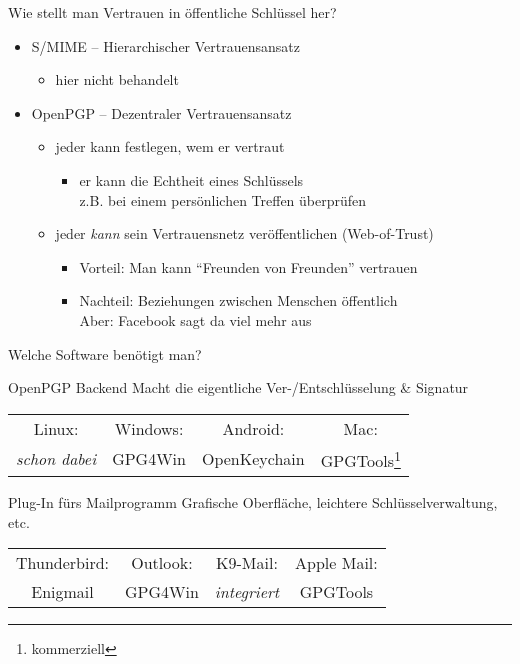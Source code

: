 \begin{frame}{Wie stellt man Vertrauen in öffentliche Schlüssel her?}
  \begin{itemize}
    \item S/MIME -- Hierarchischer Vertrauensansatz
    \begin{itemize}
      \item hier nicht behandelt
    \end{itemize}
    \item OpenPGP -- Dezentraler Vertrauensansatz
    \begin{itemize}
      \item jeder kann festlegen, wem er vertraut
      \begin{itemize}
        \item er kann die Echtheit eines Schlüssels\\ z.B. bei einem persönlichen Treffen überprüfen
      \end{itemize}
      \item jeder \emph{kann} sein Vertrauensnetz veröffentlichen (Web-of-Trust)
      \begin{itemize}
        \item Vorteil: Man kann ``Freunden von Freunden'' vertrauen
        \item Nachteil: Beziehungen zwischen Menschen öffentlich\\ Aber: Facebook sagt da viel mehr aus
      \end{itemize}
    \end{itemize}
  \end{itemize}
\end{frame}

\begin{frame}{Welche Software benötigt man?}
  \begin{block}{OpenPGP Backend}
    Macht die eigentliche Ver-/Entschlüsselung \& Signatur

    \vspace{1ex}
    \begin{tabular}{cccc}
      Linux:            & Windows: & Android:     & Mac:\\
      \emph{schon dabei} & GPG4Win  & OpenKeychain & GPGTools\footnote{kommerziell}\\
    \end{tabular}
  \end{block}
  \begin{block}{Plug-In fürs Mailprogramm}
    Grafische Oberfläche, leichtere Schlüsselverwaltung, etc.

    \vspace{1ex}
    \begin{tabular}{cccc}
      Thunderbird: & Outlook: & K9-Mail:            & Apple Mail:\\
      Enigmail     & GPG4Win  & \emph{integriert} & GPGTools\\
    \end{tabular}
  \end{block}
\end{frame}

\endinput
